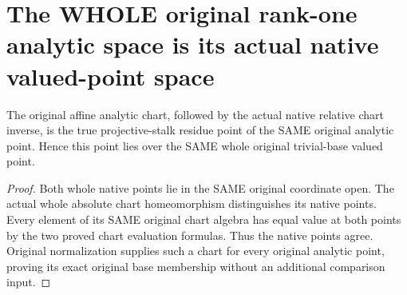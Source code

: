 \section{The WHOLE original rank-one analytic space is its actual native valued-point space}

\begin{theorem}
\label{thm:fc-native-rank-one-analytic-chart-inverse}
\leanok
{}
The original affine analytic chart, followed by the actual native
relative chart inverse, is the true projective-stalk residue point of
the SAME original analytic point. Hence this point lies over the SAME
whole original trivial-base valued point.
\end{theorem}
\begin{proof}
Both whole native points lie in the SAME original coordinate open.
The actual whole absolute chart homeomorphism distinguishes its native
points. Every element of its SAME original chart algebra has equal
value at both points by the two proved chart evaluation formulas.
Thus the native points agree. Original normalization supplies such a
chart for every original analytic point, proving its exact original
base membership without an additional comparison input.
\end{proof}

